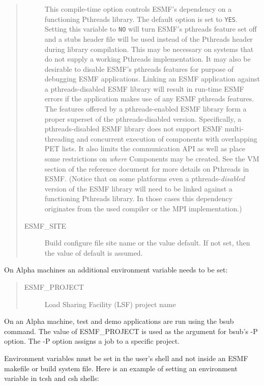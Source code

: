 \begin{quote}
\begin{description}
This compile-time option controls ESMF's dependency on a functioning Pthreads library. The default option is set to {\tt YES}. Setting this variable to {\tt NO} will turn ESMF's pthreads feature set off and a stubs header file will be used instead of the Pthreads header during library compilation. This may be necessary on systems that do not supply a working Pthreads implementation. It may also be desirable to disable ESMF's pthreads features for purpose of debugging ESMF applications. Linking an ESMF application against a pthreads-disabled ESMF library will result in run-time ESMF errors if the application makes use of any ESMF pthreads features. The features offered by a pthreads-enabled ESMF library form a proper superset of the pthreads-disabled version. Specifically, a pthreads-disabled ESMF library does not support ESMF multi-threading and concurrent execution of components with overlapping PET lists. It also limits the communication API as well as place some restrictions on {\em where} Components may be created. See the VM section of the reference document for more details on Pthreads in ESMF. (Notice that on some platforms even a pthreads-{\em disabled} version of the ESMF library will need to be linked against a functioning Pthreads library. In those cases this dependency originates from the used compiler or the MPI implementation.)

  \item[ESMF\_SITE] Build configure file site name or the value default.  
                 If not set, then the value of default is assumed.


\end{description}
\end{quote}

On Alpha machines an additional environment variable needs
to be set:

\begin{quote}
\begin{description}
  \item[ESMF\_PROJECT] Load Sharing Facility (LSF) project name
\end{description}
\end{quote}

On an Alpha machine, test and demo applications are run using 
the bsub command.  The value of ESMF\_PROJECT is used as the 
argument for bsub's -P option. The -P option assigns a job to 
a specific project.  

Environment variables must be set in the user's shell and not
inside an ESMF makefile or build system file.  Here is an example 
of setting an environment variable in tcsh and csh shells:

